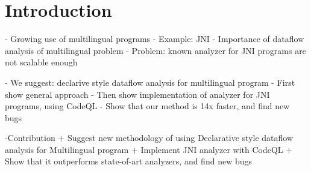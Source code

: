 \section{Introduction}
- Growing use of multilingual programs
- Example: JNI
- Importance of dataflow analysis of multilingual problem
- Problem: known analyzer for JNI programs are not scalable enough

- We suggest: declarive style dataflow analysis for multilingual program
- First show general approach
- Then show implementation of analyzer for JNI programs, using CodeQL
- Show that our method is 14x faster, and find new bugs

-Contribution
  + Suggest new methodology of using Declarative style dataflow analysis for Multilingual program
  + Implement JNI analyzer with CodeQL
  + Show that it outperforms state-of-art analyzers, and find new bugs
